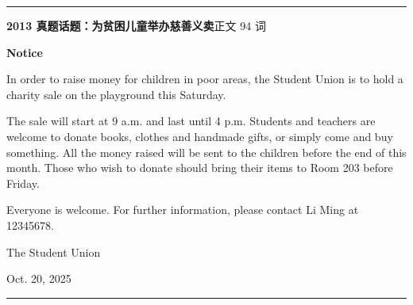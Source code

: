 \documentclass[10pt,a4paper]{ctexart}
\begin{document}
{\color{rule}\rule{\linewidth}{0.6pt}}\par\nopagebreak
\vspace{1pt}
\vspace{2pt}\noindent\colorbox{soft}{\parbox{\dimexpr\linewidth-2\fboxsep\relax}{%
\vspace{2pt}
{\footnotesize\bfseries\color{accent}2013 真题话题：为贫困儿童举办慈善义卖}\hfill{\footnotesize\color{gray}正文 94 词}
\par\vspace{2pt}
\centerline{\footnotesize\bfseries Notice}\par\vspace{2pt}
\footnotesize In order to raise money for children in poor areas, the Student Union is to hold a charity sale on the playground this Saturday.\par
\footnotesize The sale will start at 9 a.m. and last until 4 p.m. Students and teachers are welcome to donate books, clothes and handmade gifts, or simply come and buy something. All the money raised will be sent to the children before the end of this month. Those who wish to donate should bring their items to Room 203 before Friday.\par
\footnotesize Everyone is welcome. For further information, please contact Li Ming at 12345678.\par
\par\noindent\hfill\footnotesize The Student Union\par
\par\noindent\hfill\footnotesize Oct. 20, 2025\par
\par{}
\par\vspace{1pt}}}\par
\vspace{2pt}
\vspace{4pt}\par\nopagebreak
{\color{rule}\rule{\linewidth}{0.6pt}}\par\nopagebreak
\vspace{1pt}
\vspace{1pt}\begingroup\setlength{\parindent}{0pt}
\end{document}
